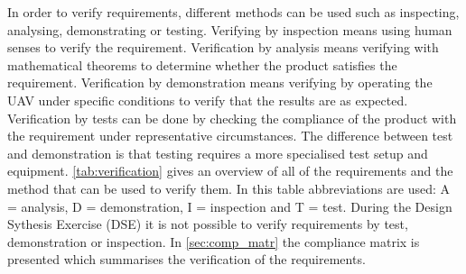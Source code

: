 In order to verify requirements, different methods can be used such as inspecting, analysing, demonstrating or testing. Verifying by inspection means using human senses to verify the requirement. Verification by analysis means verifying with mathematical theorems to determine whether the product satisfies the requirement. Verification by demonstration means verifying by operating the UAV under specific conditions to verify that the results are as expected. Verification by tests can be done by checking the compliance of the product with the requirement under representative circumstances. The difference between test and demonstration is that testing requires a more specialised test setup and equipment. \autoref{tab:verification} gives an overview of all of the requirements and the method that can be used to verify them. In this table abbreviations are used: A = analysis, D = demonstration, I = inspection and T = test. During the Design Sythesis Exercise (DSE) it is not possible to verify requirements by test, demonstration or inspection. In \autoref{sec:comp_matr} the compliance matrix is presented which summarises the verification of the requirements. 

